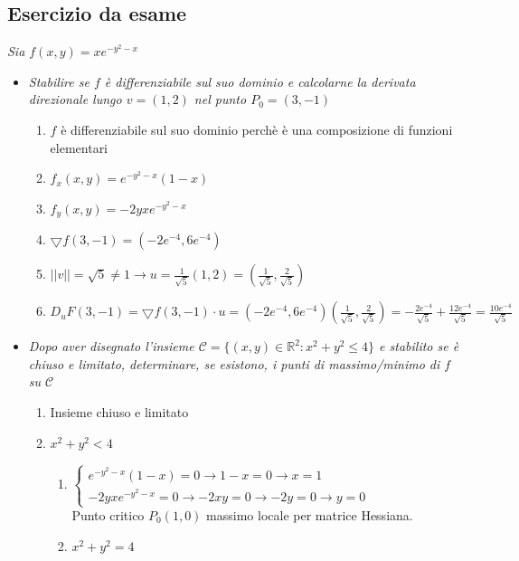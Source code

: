 \documentclass[10pt, a4paper]{article}
\begin{document}
    \subsection{Esercizio da esame}
    \textit{Sia $f(x,y)=xe^{-y^2-x}$}
    \begin{itemize}
        \item \textit{Stabilire se $f$ è differenziabile sul suo dominio e calcolarne la derivata direzionale lungo $v=(1,2)$ nel punto $P_0=(3,-1)$} \begin{enumerate}
            \item $f$ è differenziabile sul suo dominio perchè è una composizione di funzioni elementari
            \item $\displaystyle f_x(x,y)=e^{-y^2-x}(1-x)$
            \item $\displaystyle f_y(x,y)=-2yxe^{-y^2-x}$
            \item $\bigtriangledown f(3,-1)=(-2e^{-4}, 6e^{-4})$
            \item $\displaystyle ||v||=\sqrt{5}\neq 1\rightarrow u=\frac{1}{\sqrt{5}}(1,2)=\left(\frac{1}{\sqrt{5}},\frac{2}{\sqrt{5}}\right)$
            \item $\displaystyle D_uF(3,-1)=\bigtriangledown f(3,-1)\cdot u=(-2e^{-4}, 6e^{-4})\left(\frac{1}{\sqrt{5}},\frac{2}{\sqrt{5}}\right)=-\frac{2e^{-4}}{\sqrt{5}}+\frac{12e^{-4}}{\sqrt{5}}=\frac{10e^{-4}}{\sqrt{5}}$
        \end{enumerate}
        \item \textit{Dopo aver disegnato l'insieme $\displaystyle \mathcal{C}=\{(x,y)\in\mathbb{R}^2:x^2+y^2\leq 4\}$ e stabilito se è chiuso e limitato, determinare, se esistono, i punti di massimo/minimo di $f$ su $\mathcal{C}$} \begin{enumerate}
            \item Insieme chiuso e limitato
            \item $x^2+y^2<4$ \begin{enumerate}
                \item $\displaystyle \begin{cases}
                    e^{-y^2-x}(1-x) = 0 \rightarrow 1-x = 0 \rightarrow x = 1\\
                    -2yxe^{-y^2-x} = 0 \rightarrow -2xy = 0 \rightarrow -2y = 0 \rightarrow y=0
                \end{cases}$
                \\Punto critico $P_0(1,0)$ massimo locale per matrice Hessiana.
                \item $x^2+y^2=4$ \begin{enumerate}

\end{enumerate}
\end{enumerate}
\end{enumerate}
\end{itemize}
\end{document}
